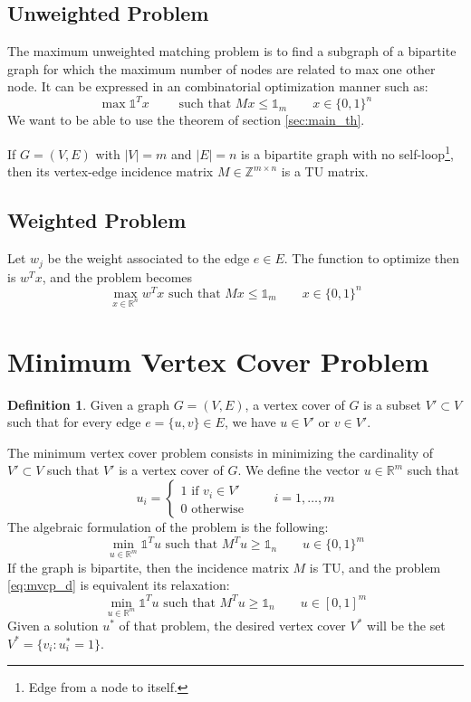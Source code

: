\documentclass[11pt, openany]{report}
\newcommand{\R}{\mathbb{R}}
\theoremstyle{definition}
\newtheorem{definition}[thm]{Definition}
\begin{document}
\subsection{Unweighted Problem}
The maximum unweighted matching problem is to find a subgraph of a bipartite graph for which the maximum number of nodes are related to max one other node. It can be expressed in an combinatorial optimization manner such as:
\begin{equation}
    \max \mathbb{1}^Tx \qquad \text{ such that } Mx\le \mathbb{1}_m \qquad x\in \{0,1\}^n
\end{equation}
We want to be able to use the theorem of section \ref{sec:main_th}. 
\begin{tcolorbox}[breakable,
    colback=white,
    colframe=white!75!black,
    title={Theorem}]
If \(G=(V,E)\) with \(|V| = m\) and \(|E|=n\) is a bipartite graph with no self-loop\footnote{Edge from a node to itself.}, then its vertex-edge incidence matrix \(M\in \mathbb{Z}^{m\times n}\) is a TU matrix.
\end{tcolorbox}
\subsection{Weighted Problem}
Let \(w_j\) be the weight associated to the edge \(e\in E\). The function to optimize then is \(w^Tx\), and the problem becomes 
\begin{equation}
    \max_{x\in \R^n} w^Tx \text{   such that   }Mx\le \mathbb{1}_m \qquad x\in \{0,1\}^n
\end{equation}
\section{Minimum Vertex Cover Problem}
\begin{definition}
    Given a graph \(G=(V,E)\), a vertex cover of \(G\) is a subset \(V'\subset V\) such that for every edge \(e=\{u,v\}\in E\), we have \(u\in V'\) or \(v\in V'\).
\end{definition}
The minimum vertex cover problem consists in minimizing the cardinality of \(V'\subset V\) such that \(V'\) is a vertex cover of \(G\). We define the vector \(u\in \R^m\) such that
\begin{equation}
    u_i = \begin{cases}
        1 \text{ if } v_i\in V'\\
        0\text{ otherwise}
    \end{cases}\qquad i=1,\dots,m
\end{equation}
The algebraic formulation of the problem is the following:
\begin{equation}\label{eq:mvcp_d}
    \min_{u\in \R^m}\mathbb{1}^Tu \text{ such that }M^Tu\ge \mathbb{1}_n\qquad u\in \{0,1\}^m
\end{equation}
If the graph is bipartite, then the incidence matrix \(M\) is TU, and the problem \eqref{eq:mvcp_d} is equivalent its relaxation:
\begin{equation}
    \min_{u\in \R^m}\mathbb{1}^Tu \text{ such that }M^Tu\ge \mathbb{1}_n\qquad u\in [0,1]^m
\end{equation}
Given a solution \(u^*\) of that problem, the desired vertex cover \(V^*\) will be the set \(V^* = \{v_i:u_i^*=1\}\). 
\end{document}

